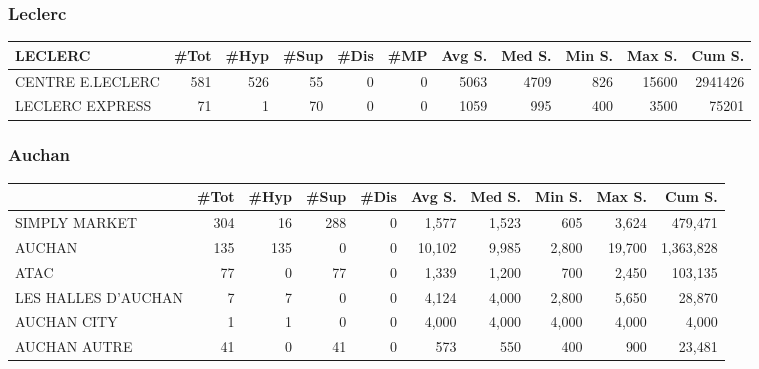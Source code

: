\documentclass[11pt]{article}
\begin{document}
\subsubsection{Leclerc}

\begin{table}[H]
\footnotesize
\setlength{\tabcolsep}{2pt}

\begin{tabular}{lrrrrrrrrrr}
\toprule
LECLERC &       \#Tot &       \#Hyp &       \#Sup &       \#Dis &        \#MP &     Avg S. &     Med S. &     Min S. &     Max S. &     Cum S. \\
\midrule
CENTRE E.LECLERC &        581 &        526 &         55 &          0 &          0 &       5063 &       4709 &        826 &      15600 &    2941426 \\
LECLERC EXPRESS  &         71 &          1 &         70 &          0 &          0 &       1059 &        995 &        400 &       3500 &      75201 \\
\bottomrule
\end{tabular}

\end{table}



\subsubsection{Auchan}

\begin{table}[H]
\footnotesize
\setlength{\tabcolsep}{2pt}

\begin{tabular}{lrrrrrrrrr}
\toprule
{} &       \#Tot &       \#Hyp &       \#Sup &       \#Dis &     Avg S. &     Med S. &     Min S. &     Max S. &     Cum S. \\
\midrule
SIMPLY MARKET       &        304 &         16 &        288 &          0 &      1,577 &      1,523 &        605 &      3,624 &    479,471 \\
AUCHAN              &        135 &        135 &          0 &          0 &     10,102 &      9,985 &      2,800 &     19,700 &  1,363,828 \\
ATAC                &         77 &          0 &         77 &          0 &      1,339 &      1,200 &        700 &      2,450 &    103,135 \\
LES HALLES D'AUCHAN &          7 &          7 &          0 &          0 &      4,124 &      4,000 &      2,800 &      5,650 &     28,870 \\
AUCHAN CITY         &          1 &          1 &          0 &          0 &      4,000 &      4,000 &      4,000 &      4,000 &      4,000 \\
AUCHAN AUTRE        &         41 &          0 &         41 &          0 &        573 &        550 &        400 &        900 &     23,481 \\
\bottomrule
\end{tabular}

\end{table}
\end{document}
